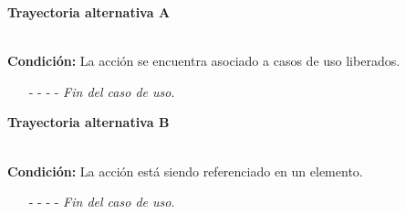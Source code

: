 \hypertarget{CU11-1-3:TAA}{\textbf{Trayectoria alternativa A}}\\
\noindent \textbf{Condición:} La acción se encuentra asociado a casos de uso liberados.
\begin{enumerate}
	\UCpaso[\UCsist] Oculta el botón \eliminar de la acción que esta asociado a casos de uso liberados.
	\item[- -] - - {\em {Fin del caso de uso}}.
\end{enumerate}
\hypertarget{CU11-1-3:TAB}{\textbf{Trayectoria alternativa B}}\\
\noindent \textbf{Condición:} La acción está siendo referenciado en un elemento.
\begin{enumerate}
	\UCpaso[\UCsist] Muestra la pantalla  o  con el mensaje  mostrando una lista de elementos que están referenciando a la acción.
	\item[- -] - - {\em {Fin del caso de uso}}.%
\end{enumerate}
	

